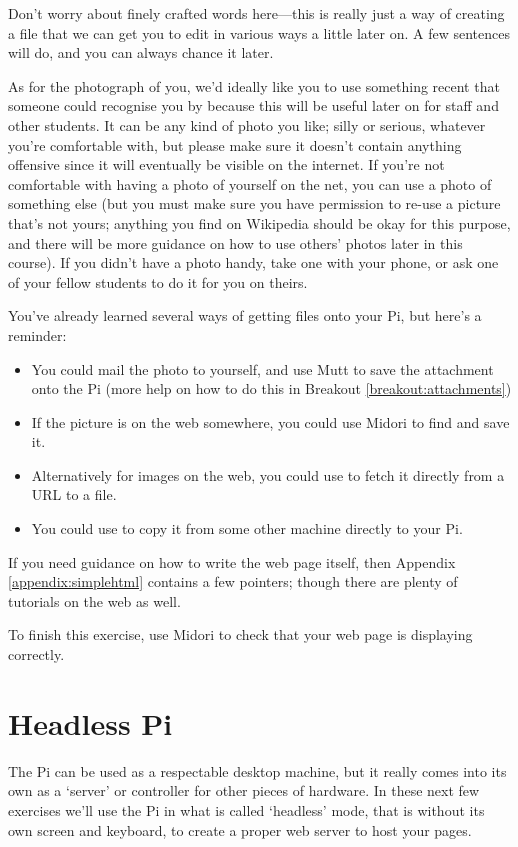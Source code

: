 Don't worry about finely crafted words here---this is really just a way of creating a file that we can get you to edit in various ways a little later on. A few sentences will do, and you can always chance it later. 

As for the photograph of you, we'd ideally like you to use something recent that someone could recognise you by because this will be useful later on for staff and other students. It can be any kind of photo you like; silly or serious, whatever you're comfortable with, but please make sure it doesn't contain anything offensive since it will eventually be visible on the internet. If you're not comfortable with having a photo of yourself on the net, you can use a photo of something else (but you must make sure you have permission to re-use a picture that's not yours; anything you find on Wikipedia should be okay for this purpose, and there will be more guidance on how to use others' photos later in this course). If you didn't have a photo handy, take one with your phone, or ask one of your fellow students to do it for you on theirs.

You've already learned several ways of getting files onto your Pi, but here's a reminder:
\begin{itemize}
\item You could mail the photo to yourself, and use Mutt to save the attachment onto the Pi (more help on how to do this in Breakout \ref{breakout:attachments})
\item If the picture is on the web somewhere, you could use Midori to find and save it. 
\item Alternatively for images on the web, you could use  to fetch it directly from a URL to a file. 
\item You could use  to copy it from some other machine directly to your Pi. 
\end{itemize}

If you need guidance on how to write the web page itself, then Appendix \ref{appendix:simplehtml} contains a few pointers; though there are plenty of tutorials on the web as well. 

To finish this exercise, use Midori to check that your web page is displaying correctly.

\section{Headless Pi}

The Pi can be used as a respectable desktop machine, but it really comes into its own as a `server' or controller for other pieces of hardware. In these next few exercises we'll use the Pi in what is called `headless' mode, that is without its own screen and keyboard, to create a proper web server to host your pages. 

